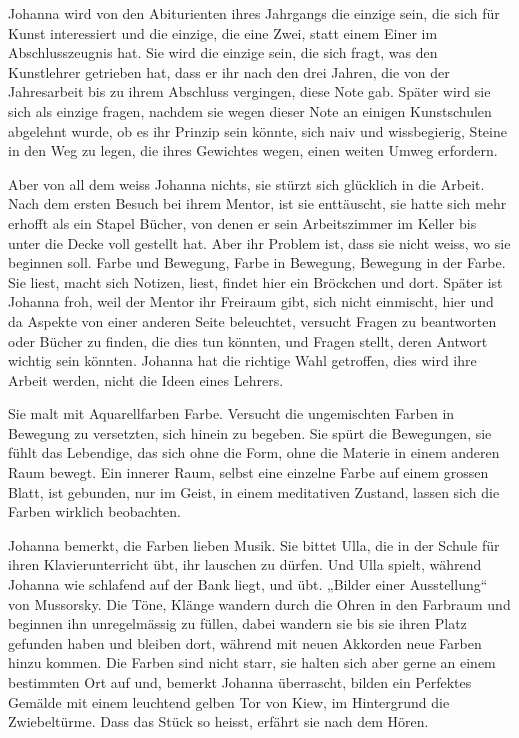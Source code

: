 \documentclass[10pt,a5paper]{book}
\begin{document}
Johanna wird von den Abiturienten ihres Jahrgangs die einzige sein, die sich für Kunst interessiert und die einzige, die eine Zwei, statt einem Einer im Abschlusszeugnis hat. Sie wird die einzige sein, die sich fragt, was den Kunstlehrer getrieben hat, dass er ihr nach den drei Jahren, die von der Jahresarbeit bis zu ihrem Abschluss vergingen, diese Note gab. Später wird sie sich als einzige fragen, nachdem sie wegen dieser Note an einigen Kunstschulen abgelehnt wurde, ob es ihr Prinzip sein könnte, sich naiv und wissbegierig, Steine in den Weg zu legen, die ihres Gewichtes wegen, einen weiten Umweg erfordern.

Aber von all dem weiss Johanna nichts, sie stürzt sich glücklich in die Arbeit. Nach dem ersten Besuch bei ihrem Mentor, ist sie enttäuscht, sie hatte sich mehr erhofft als ein Stapel Bücher, von denen er sein Arbeitszimmer im Keller bis unter die Decke voll gestellt hat. Aber ihr Problem ist, dass sie nicht weiss, wo sie beginnen soll. Farbe und Bewegung, Farbe in Bewegung, Bewegung in der Farbe. Sie liest, macht sich Notizen, liest, findet hier ein Bröckchen und dort. Später ist Johanna froh, weil der Mentor ihr Freiraum gibt, sich nicht einmischt, hier und da Aspekte von einer anderen Seite beleuchtet, versucht Fragen zu beantworten oder Bücher zu finden, die dies tun könnten, und Fragen stellt, deren Antwort wichtig sein könnten. Johanna hat die richtige Wahl getroffen, dies wird ihre Arbeit werden, nicht die Ideen eines Lehrers.

Sie malt mit Aquarellfarben Farbe. Versucht die ungemischten Farben in Bewegung zu versetzten, sich hinein zu begeben. Sie spürt die Bewegungen, sie fühlt das Lebendige, das sich ohne die Form, ohne die Materie in einem anderen Raum bewegt. Ein innerer Raum, selbst eine einzelne Farbe auf einem grossen Blatt, ist gebunden, nur im Geist, in einem meditativen Zustand, lassen sich die Farben wirklich beobachten.

Johanna bemerkt, die Farben lieben Musik. Sie bittet Ulla, die in der Schule für ihren Klavierunterricht übt, ihr lauschen zu dürfen. Und Ulla spielt, während Johanna wie schlafend auf der Bank liegt, und übt. „Bilder einer Ausstellung“ von Mussorsky. Die Töne, Klänge wandern durch die Ohren in den Farbraum und beginnen ihn unregelmässig zu füllen, dabei wandern sie bis sie ihren Platz gefunden haben und bleiben dort, während mit neuen Akkorden neue Farben hinzu kommen. Die Farben sind nicht starr, sie halten sich aber gerne an einem bestimmten Ort auf und, bemerkt Johanna überrascht, bilden ein Perfektes Gemälde mit einem leuchtend gelben Tor von Kiew, im Hintergrund die Zwiebeltürme. Dass  das Stück so heisst, erfährt sie nach dem Hören.
\end{document}
